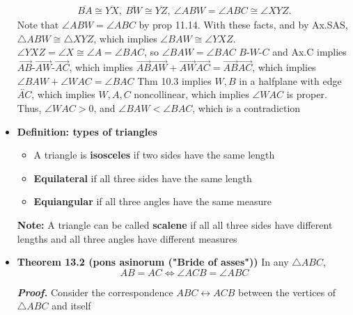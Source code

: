 \documentclass{report}
\begin{document}
\begin{itemize}
            \begin{align*}
                \overline{BA} \cong \overline{YX},\ \overline{BW} \cong \overline{YZ},\ \angle ABW = \angle ABC \cong \angle XYZ
            .\end{align*}
            Note that $\angle ABW = \angle ABC$ by prop 11.14. With these facts, and by Ax.SAS, $ \triangle ABW \cong \triangle XYZ$, which implies $ \angle BAW \cong \angle YXZ$.
            \bigbreak \noindent 
            $\angle YXZ = \angle X \cong \angle A = \angle BAC$, so $\angle BAW = \angle BAC$
            \bigbreak \noindent 
            $ B\text{-}W\text{-}C$ and Ax.C implies $ \overrightarrow{AB}\text{-}\overrightarrow{AW}\text{-}\overrightarrow{AC} $, which implies $ \overrightarrow{AB}\overrightarrow{AW}  + \overrightarrow{AW}\overrightarrow{AC} = \overrightarrow{AB}\overrightarrow{AC}$, which implies $ \angle BAW + \angle WAC = \angle BAC $
            \bigbreak \noindent 
            Thm 10.3 implies $W,B$ in a halfplane with edge $\overleftrightarrow{AC}$, which implies $W,A,C$ noncollinear, which implies $ \angle WAC$ is proper. Thus, $ \angle WAC > 0$, and $ \angle BAW < \angle BAC$, which is a contradiction \endpf
        \item \textbf{Definition: types of triangles}
            \begin{itemize}
                \item A triangle is \textbf{isosceles} if two sides have the same length
                \item \textbf{Equilateral} if all three sides have the same length
                \item \textbf{Equiangular} if all three angles have the same measure  
            \end{itemize}
            \textbf{Note:} A triangle can be called \textbf{scalene} if all all three sides have different lengths and all three angles have different measures
        \item \textbf{Theorem 13.2 (pons asinorum ("Bride of asses"))} In any $\triangle ABC$, 
            $$ AB = AC \iff \angle ACB = \angle ABC $$
            \bigbreak \noindent 
            \begin{figure}[ht]
                \centering
                \label{fig:assse}
            \end{figure}
            \bigbreak \noindent 
            \textbf{\textit{Proof.}} Consider the correspondence $ABC \leftrightarrow ACB$ between the vertices of $\triangle ABC$ and itself

\end{itemize}
\end{document}

